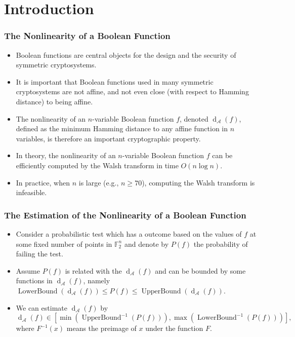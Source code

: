 \documentclass[
    aspectratio=169,                   %
]{beamer}
\newcommand{\F}{\mathbb{F}}
\newcommand{\nnl}{\operatorname{d}_{\mathcal{A}}}
\begin{document}
\section{Introduction}
    \begin{frame}
        \frametitle{The Nonlinearity of a Boolean Function}
        \begin{itemize}
            \item Boolean functions are central objects for the design and the security of symmetric cryptosystems.
            \item It is important that Boolean functions used in many symmetric cryptosystems are not affine, and not even close (with respect to Hamming distance) to being affine.
            \item The nonlinearity of an $n$-variable Boolean function $f$, denoted $\nnl(f)$, defined as the minimum Hamming distance to
            any affine function in $n$ variables, is therefore an important cryptographic property. 
            \item In theory, the nonlinearity of an $n$-variable Boolean function $f$ can be efficiently computed by the Walsh transform in time $O(n\log n)$.
            \item In practice, when $n$ is large (e.g., $n\ge 70$), computing the Walsh transform is infeasible.
        \end{itemize}
        
    \end{frame}
    
    \begin{frame}
        \frametitle{The Estimation of the Nonlinearity of a Boolean Function}
        \begin{itemize}
            \item Consider a probabilistic test which has a outcome based on the values of $f$ at some fixed number of points in $\F_2^n$ and denote by $P(f)$ the probability of failing the test.
            \item Assume $P(f)$ is related with the $\nnl(f)$ and can be bounded by some functions in $\nnl(f)$, namely $\operatorname{LowerBound}(\nnl(f))\le P(f)\le \operatorname{UpperBound}(\nnl(f))$.
            \item We can estimate $\nnl(f)$ by 
            \[\nnl(f)\in\left[ \min(\operatorname{UpperBound}^{-1}(P(f))),\max(\operatorname{LowerBound}^{-1}(P(f))) \right],\]
            where $F^{-1}(x)$ means the preimage of $x$ under the function $F$.
        \end{itemize}
    \end{frame}
        
\end{document}
